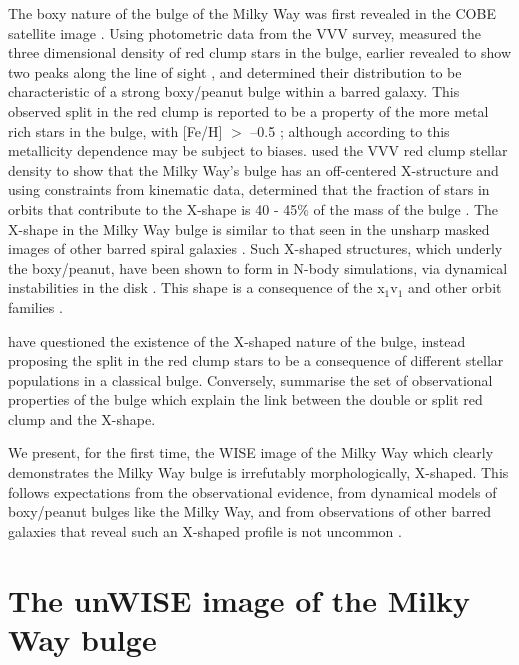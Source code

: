 \documentclass[12pt, preprint]{aastex}
\begin{document}
The boxy nature of the bulge of the Milky Way was first revealed in the COBE satellite image \citep{Dwek1995}. Using photometric data from the VVV survey, \citet{Wegg2013} measured the three dimensional density of red clump stars in the bulge, earlier revealed to show two peaks along the line of sight \citep{McWilliam2010, Nataf2010}, and determined their distribution to be characteristic of a strong boxy/peanut bulge within a barred galaxy. This observed split in the red clump is reported to be a property of the more metal rich stars in the bulge, with [Fe/H] $>$ --0.5 \citep{Ness2012, Uttenthaler2012}; although according to \citet{Nataf2014} this metallicity dependence may be subject to biases.  \citet{Portail2015b} used the VVV red clump stellar density to show that the Milky Way's bulge has an off-centered X-structure and using constraints from kinematic data, determined that the fraction of stars in orbits that contribute to the X-shape is 40 - 45\% of the mass of the bulge \citep{Portail2015a}. The X-shape in the Milky Way bulge is similar to that seen in the unsharp masked images of other barred spiral galaxies  \citep[e.g.][]{Bureau2006}. Such X-shaped structures, which underly the boxy/peanut, have been shown to form in N-body simulations, via dynamical instabilities in the disk \citep[e.g.][]{Athanassoula2005, Debattista2006, Inma2006}. This shape is a consequence of the x$_{1}$v$_{1}$ \citep{P1984, Athanassoula1992} and other orbit families \citep[e.g.][]{Portail2015b}. 

\citet{Lee2015} have questioned the existence of the X-shaped nature of the bulge, instead proposing the split in the red clump stars to be a consequence of different stellar populations in a classical bulge. Conversely,  \citet{Gonzalez2015} summarise the set of observational properties of the bulge which explain the link between the double or split red clump and the X-shape.


 We present, for the first time, the WISE image of the Milky Way \citep{Lang2014a} which clearly demonstrates the Milky Way bulge is irrefutably morphologically, X-shaped. This follows expectations from the observational evidence,  from dynamical models of boxy/peanut bulges like the Milky Way, and from observations of other barred galaxies that reveal such an X-shaped profile is not uncommon \citep{L2014}. 

\section{The unWISE image of the Milky Way bulge}
\end{document}
